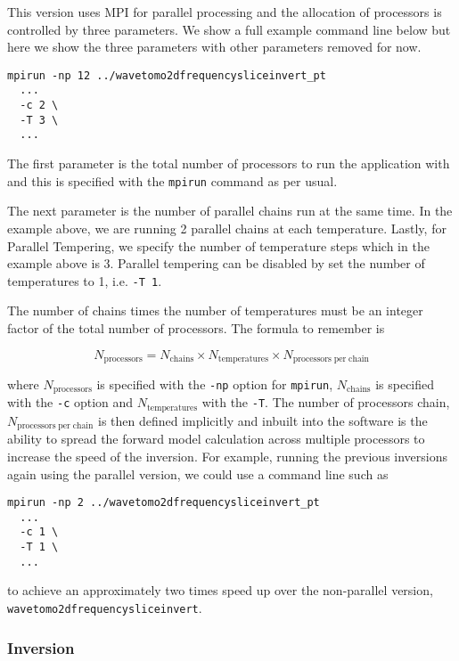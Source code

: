 \documentclass[a4paper,12pt]{article}
\begin{document}
This version uses MPI for parallel processing and the allocation
of processors is controlled by three parameters. We show a full
example command line below but here we show the three parameters
with other parameters removed for now.

\begin{verbatim}
mpirun -np 12 ../wavetomo2dfrequencysliceinvert_pt 
  ...
  -c 2 \
  -T 3 \
  ...
\end{verbatim}

The first parameter is the total number of processors to run
the application with and this is specified with the {\tt mpirun}
command as per usual.

The next parameter is the number of parallel chains run at the
same time. In the example above, we are running 2 parallel chains
at each temperature. Lastly, for Parallel Tempering, we
specify the number of temperature steps which in the example above
is 3. Parallel tempering can be disabled by set the number of
temperatures to 1, i.e. {\tt -T 1}.

The number of chains times the number of temperatures must be an
integer factor of the total number of processors. The formula
to remember is

\begin{equation}
  N_{\mathrm{processors}} = N_{\mathrm{chains}} \times
  N_{\mathrm{temperatures}} \times N_{\mathrm{processors\; per\; chain}}
\end{equation}

where $N_{\mathrm{processors}}$ is specified with the {\tt -np} option
for {\tt mpirun}, $N_{\mathrm{chains}}$ is specified with the {\tt -c}
option and $N_{\mathrm{temperatures}}$ with the {\tt -T}.  The number
of processors chain, $N_{\mathrm{processors\; per\; chain}}$ is then
defined implicitly and inbuilt into the software is the ability to
spread the forward model calculation across multiple processors to
increase the speed of the inversion. For example, running the previous
inversions again using the parallel version, we could use a command
line such as

\begin{verbatim}
mpirun -np 2 ../wavetomo2dfrequencysliceinvert_pt 
  ...
  -c 1 \
  -T 1 \
  ...
\end{verbatim}

to achieve an approximately two times speed up over the
non-parallel version, {\tt wavetomo2dfrequencysliceinvert}.

\subsubsection{Inversion}
\end{document}
